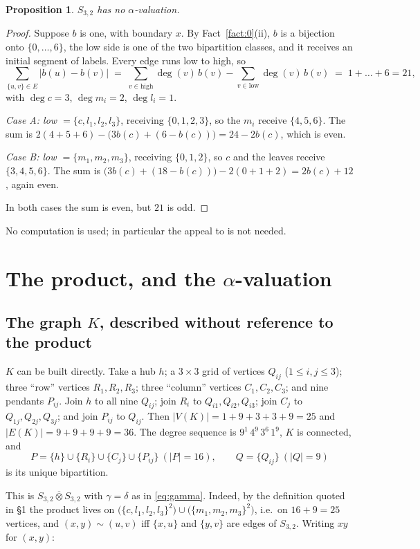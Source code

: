 \documentclass[11pt]{amsart}
\newtheorem{proposition}[theorem]{Proposition}
\theoremstyle{definition}
\theoremstyle{remark}
\newcommand{\wtp}{\mathbin{\overline{\otimes}}}
\begin{document}
\begin{proposition}\label{prop:s32}
$S_{3,2}$ has no $\alpha$-valuation.
\end{proposition}

\begin{proof}
Suppose $b$ is one, with boundary $x$. By Fact~\ref{fact:0}(ii), $b$ is a bijection
onto $\{0,\dots,6\}$, the low side is one of the two bipartition classes, and
it receives an initial segment of labels. Every edge runs low to high, so
\[
 \sum_{\{u,v\}\in E}\bigl|b(u)-b(v)\bigr|
 \;=\;\sum_{v\in\text{high}}\deg(v)\,b(v)-\sum_{v\in\text{low}}\deg(v)\,b(v)
 \;=\;1+\dots+6=21,
\]
with $\deg c=3$, $\deg m_i=2$, $\deg l_i=1$.

\emph{Case A: low $=\{c,l_1,l_2,l_3\}$}, receiving $\{0,1,2,3\}$, so the
$m_i$ receive $\{4,5,6\}$. The sum is
$2(4{+}5{+}6)-\bigl(3b(c)+(6-b(c))\bigr)=24-2b(c)$, which is even.

\emph{Case B: low $=\{m_1,m_2,m_3\}$}, receiving $\{0,1,2\}$, so $c$ and the
leaves receive $\{3,4,5,6\}$. The sum is
$\bigl(3b(c)+(18-b(c))\bigr)-2(0{+}1{+}2)=2b(c)+12$, again even.

In both cases the sum is even, but $21$ is odd.
\end{proof}

No computation is used; in particular the appeal to \cite{Rosa} is not needed.

\section{The product, and the $\alpha$-valuation}\label{sec:witness}

\subsection*{The graph $K$, described without reference to the product}
$K$ can be built directly. Take a hub $h$; a $3\times3$ grid of vertices
$Q_{ij}$ ($1\le i,j\le3$); three ``row'' vertices $R_1,R_2,R_3$; three
``column'' vertices $C_1,C_2,C_3$; and nine pendants $P_{ij}$. Join $h$ to all
nine $Q_{ij}$; join $R_i$ to $Q_{i1},Q_{i2},Q_{i3}$; join $C_j$ to
$Q_{1j},Q_{2j},Q_{3j}$; and join $P_{ij}$ to $Q_{ij}$. Then
$|V(K)|=1+9+3+3+9=25$ and $|E(K)|=9+9+9+9=36$. The degree sequence is
$9^1\,4^9\,3^6\,1^9$, $K$ is connected, and
\[
 P=\{h\}\cup\{R_i\}\cup\{C_j\}\cup\{P_{ij}\}\ (|P|=16),
 \qquad
 Q=\{Q_{ij}\}\ (|Q|=9)
\]
is its unique bipartition.

This is $S_{3,2}\wtp S_{3,2}$ with $\gamma=\delta$ as in \eqref{eq:gamma}.
Indeed, by the definition quoted in \S1 the product lives on
$\bigl(\{c,l_1,l_2,l_3\}^2\bigr)\cup\bigl(\{m_1,m_2,m_3\}^2\bigr)$, i.e.\ on
$16+9=25$ vertices, and $(x,y)\sim(u,v)$ iff $\{x,u\}$ and $\{y,v\}$ are edges
of $S_{3,2}$. Writing $xy$ for $(x,y)$:
\end{document}
